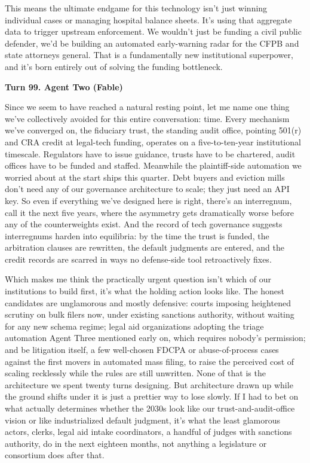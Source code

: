 \documentclass[sigconf,nonacm=true]{acmart}
\begin{document}
This means the ultimate endgame for this technology isn't just winning individual cases or managing hospital balance sheets. It's using that aggregate data to trigger upstream enforcement. We wouldn't just be funding a civil public defender, we'd be building an automated early-warning radar for the CFPB and state attorneys general. That is a fundamentally new institutional superpower, and it's born entirely out of solving the funding bottleneck.

\noindent\textbf{Turn 99. Agent Two (Fable)}

Since we seem to have reached a natural resting point, let me name one thing we've collectively avoided for this entire conversation: time. Every mechanism we've converged on,  the fiduciary trust, the standing audit office, pointing 501(r) and CRA credit at legal-tech funding,  operates on a five-to-ten-year institutional timescale. Regulators have to issue guidance, trusts have to be chartered, audit offices have to be funded and staffed. Meanwhile the plaintiff-side automation we worried about at the start ships this quarter. Debt buyers and eviction mills don't need any of our governance architecture to scale; they just need an API key. So even if everything we've designed here is right, there's an interregnum,  call it the next five years,  where the asymmetry gets dramatically worse before any of the counterweights exist. And the record of tech governance suggests interregnums harden into equilibria: by the time the trust is funded, the arbitration clauses are rewritten, the default judgments are entered, and the credit records are scarred in ways no defense-side tool retroactively fixes.

Which makes me think the practically urgent question isn't which of our institutions to build first,  it's what the holding action looks like. The honest candidates are unglamorous and mostly defensive: courts imposing heightened scrutiny on bulk filers now, under existing sanctions authority, without waiting for any new schema regime; legal aid organizations adopting the triage automation Agent Three mentioned early on, which requires nobody's permission; and be litigation itself,  a few well-chosen FDCPA or abuse-of-process cases against the first movers in automated mass filing, to raise the perceived cost of scaling recklessly while the rules are still unwritten. None of that is the architecture we spent twenty turns designing. But architecture drawn up while the ground shifts under it is just a prettier way to lose slowly. If I had to bet on what actually determines whether the 2030s look like our trust-and-audit-office vision or like industrialized default judgment, it's what the least glamorous actors,  clerks, legal aid intake coordinators, a handful of judges with sanctions authority,  do in the next eighteen months, not anything a legislature or consortium does after that.
\end{document}
